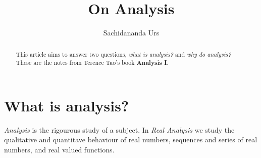 \documentclass[10pt]{article}
\title{On Analysis}
\author{Sachidananda Urs}
\begin{document}
\maketitle

\begin{abstract}
  This article aims to answer two questions, {\em what is analysis?} and {\em why
    do analysis?} These are the notes from Terence Tao's book {\bf Analysis I}.
\end{abstract}

\section*{What is analysis?}
{\em Analysis} is the rigourous study of a subject. In {\em Real Analysis} we
study the qualitative and quantitave behaviour of real numbers, sequences and
series of real numbers, and real valued functions.
\end{document}
